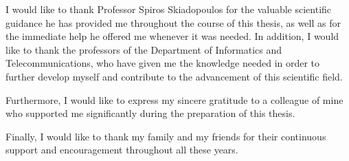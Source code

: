 





I would like to thank Professor Spiros Skiadopoulos for the valuable scientific guidance he has provided me throughout the course of this thesis, as well as for the immediate help he offered me whenever it was needed. In addition, I would like to thank the professors of the Department of Informatics and Telecommunications, who have given me the knowledge needed in order to further develop myself and contribute to the advancement of this scientific field.

Furthermore, I would like to express my sincere gratitude to a colleague of mine who supported me significantly during the preparation of this thesis.

Finally, I would like to thank my family and my friends for their continuous support and encouragement throughout all these years. 